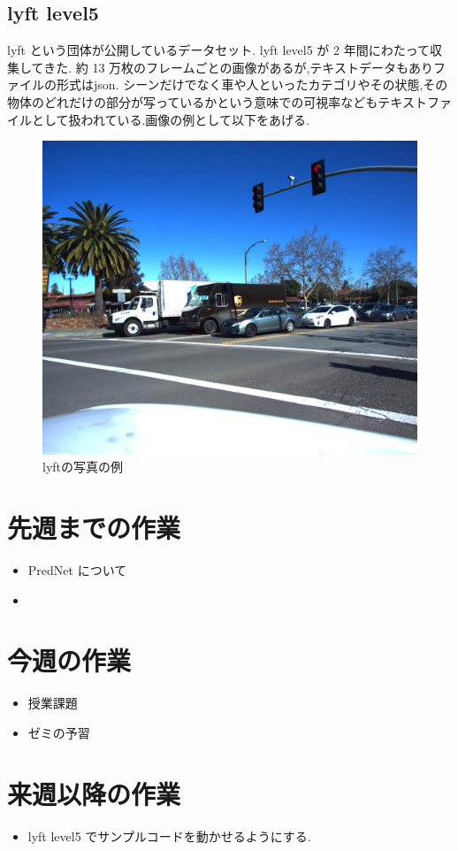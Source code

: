 \subsection{lyft level5}
lyft という団体が公開しているデータセット. lyft level5 が 2 年間にわたって収集してきた.
約 13 万枚のフレームごとの画像があるが,テキストデータもありファイルの形式はjson. シーンだけでなく車や人といったカテゴリやその状態,その物体のどれだけの部分が写っているかという意味での可視率などもテキストファイルとして扱われている.画像の例として以下をあげる.
 \begin{figure}[hb]
\includegraphics[scale=0.2]{host-a007_cam1_1233515297634286006.jpeg}
 \caption{lyftの写真の例}
\end{figure}

\section{先週までの作業}
\begin{itemize}
          \item PredNet について
          \item 
\end{itemize}

\section{今週の作業}
\begin{itemize}
         \item 授業課題
         \item ゼミの予習
\end{itemize}

\section{来週以降の作業}
\begin{itemize}
         \item lyft level5 でサンプルコードを動かせるようにする.
\end{itemize}






